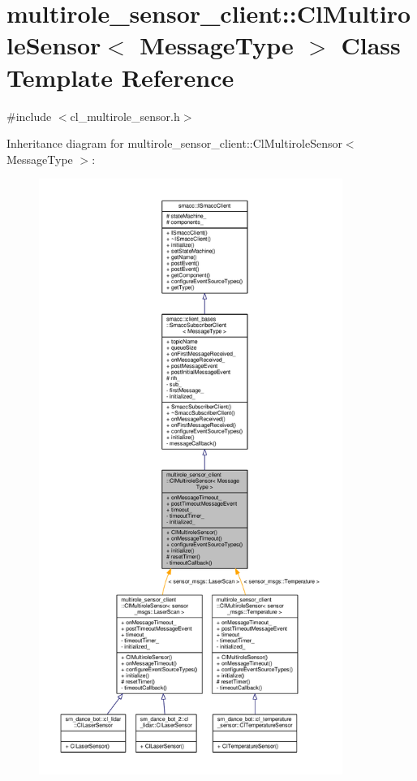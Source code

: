 \hypertarget{classmultirole__sensor__client_1_1ClMultiroleSensor}{}\section{multirole\+\_\+sensor\+\_\+client\+:\+:Cl\+Multirole\+Sensor$<$ Message\+Type $>$ Class Template Reference}
\label{classmultirole__sensor__client_1_1ClMultiroleSensor}


{\ttfamily \#include $<$cl\+\_\+multirole\+\_\+sensor.\+h$>$}



Inheritance diagram for multirole\+\_\+sensor\+\_\+client\+:\+:Cl\+Multirole\+Sensor$<$ Message\+Type $>$\+:\nopagebreak
\begin{figure}[H]
\begin{center}
\leavevmode
\includegraphics[height=550pt]{classmultirole__sensor__client_1_1ClMultiroleSensor__inherit__graph}
\end{center}
\end{figure}


